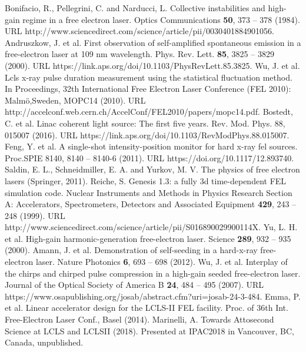 \documentclass[%
 preprint,
 amsmath,amssymb,
 aps,
 prl,
 superscriptaddress,
 floatfix,
 letter,
]{revtex4-1}
\begin{document}
\begin{thebibliography}{99}
Bonifacio, R., Pellegrini, C. and Narducci, L. Collective instabilities and high-gain regime in a free electron laser. Optics Communications {\bf 50}, 373 -- 378 (1984). URL http://www.sciencedirect.com/science/article/pii/0030401884901056.
Andruszkow, J. et al. First observation of self-amplified spontaneous emission in a free-electron laser at 109 nm wavelength. Phys. Rev. Lett. {\bf 85}, 3825 -- 3829 (2000). URL https://link.aps.org/doi/10.1103/PhysRevLett.85.3825.
Wu, J. et al. Lcls x-ray pulse duration measurement using the statistical fluctuation method. In Proceedings, 32th International Free Electron Laser Conference (FEL 2010): Malm{\"{o}},Sweden, MOPC14 (2010). URL http://accelconf.web.cern.ch/AccelConf/FEL2010/papers/mopc14.pdf.
Bostedt, C. et al. Linac coherent light source: The first five
years. Rev. Mod. Phys. 88, 015007 (2016). URL https://link.aps.org/doi/10.1103/RevModPhys.88.015007.
Feng, Y. et al. A single-shot intensity-position monitor for hard x-ray fel sources. Proc.SPIE 8140, 8140 -- 8140-6 (2011). URL https://doi.org/10.1117/12.893740.
Saldin, E. L., Schneidmiller, E. A. and Yurkov, M. V. The physics of free electron lasers (Springer, 2011).
Reiche, S. Genesis 1.3: a fully 3d time-dependent FEL simulation code. Nuclear Instruments and Methods in Physics Research Section A: Accelerators, Spectrometers,
Detectors and Associated Equipment {\bf 429}, 243 -- 248 (1999). URL http://www.sciencedirect.com/science/article/pii/S016890029900114X.
Yu, L. H. et al. High-gain harmonic-generation free-electron laser. Science {\bf 289}, 932 -- 935 (2000).
Amann, J. et al. Demonstration of self-seeding in a hard-x-ray free-electron laser. Nature Photonics {\bf 6}, 693 -- 698 (2012).
Wu, J. et al. Interplay of the chirps and chirped pulse compression in a high-gain seeded free-electron laser. Journal of the Optical Society of America B {\bf 24}, 484 -- 495 (2007). URL https://www.osapublishing.org/josab/abstract.cfm?uri=josab-24-3-484.
Emma, P. et al. Linear accelerator design for the LCLS-II FEL facility. Proc. of 36th Int. Free-Electron Laser Conf., Basel (2014).
Marinelli, A. Towards Attosecond Science at LCLS and LCLSII (2018). Presented at IPAC2018 in Vancouver, BC, Canada, unpublished.

\end{thebibliography}
\end{document}

